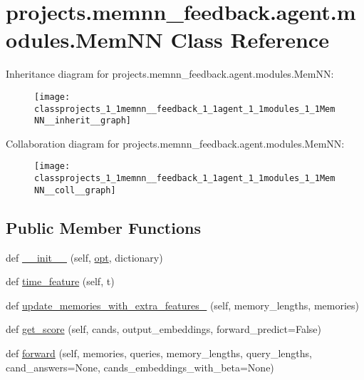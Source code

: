 \hypertarget{classprojects_1_1memnn__feedback_1_1agent_1_1modules_1_1MemNN}{}\section{projects.\+memnn\+\_\+feedback.\+agent.\+modules.\+Mem\+NN Class Reference}
\label{classprojects_1_1memnn__feedback_1_1agent_1_1modules_1_1MemNN}


Inheritance diagram for projects.\+memnn\+\_\+feedback.\+agent.\+modules.\+Mem\+NN\+:
\nopagebreak
\begin{figure}[H]
\begin{center}
\leavevmode
\texttt{[image: classprojects\_1\_1memnn\_\_feedback\_1\_1agent\_1\_1modules\_1\_1MemNN\_\_inherit\_\_graph]}
\end{center}
\end{figure}


Collaboration diagram for projects.\+memnn\+\_\+feedback.\+agent.\+modules.\+Mem\+NN\+:
\nopagebreak
\begin{figure}[H]
\begin{center}
\leavevmode
\texttt{[image: classprojects\_1\_1memnn\_\_feedback\_1\_1agent\_1\_1modules\_1\_1MemNN\_\_coll\_\_graph]}
\end{center}
\end{figure}
\subsection*{Public Member Functions}
\begin{DoxyCompactItemize}
\item 
def \hyperlink{classprojects_1_1memnn__feedback_1_1agent_1_1modules_1_1MemNN_a8fa66da5b82d5f224fe6d90f6beb4715}{\+\_\+\+\_\+init\+\_\+\+\_\+} (self, \hyperlink{classprojects_1_1memnn__feedback_1_1agent_1_1modules_1_1MemNN_ad5ca60da96aa65443275f7702521ed4d}{opt}, dictionary)
\item 
def \hyperlink{classprojects_1_1memnn__feedback_1_1agent_1_1modules_1_1MemNN_a74960a2ae628065a6c18e1125b8fd9fc}{time\+\_\+feature} (self, t)
\item 
def \hyperlink{classprojects_1_1memnn__feedback_1_1agent_1_1modules_1_1MemNN_a0842ffd89a6a7b05ecd96ffd9167ec25}{update\+\_\+memories\+\_\+with\+\_\+extra\+\_\+features\+\_\+} (self, memory\+\_\+lengths, memories)
\item 
def \hyperlink{classprojects_1_1memnn__feedback_1_1agent_1_1modules_1_1MemNN_abdfd4ea1cd5d9eada46e5f091d026d59}{get\+\_\+score} (self, cands, output\+\_\+embeddings, forward\+\_\+predict=False)
\item 
def \hyperlink{classprojects_1_1memnn__feedback_1_1agent_1_1modules_1_1MemNN_a2e5d4d84ef6b83ba8e6d8e765727973d}{forward} (self, memories, queries, memory\+\_\+lengths, query\+\_\+lengths, cand\+\_\+answers=None, cands\+\_\+embeddings\+\_\+with\+\_\+beta=None)
\end{DoxyCompactItemize}
